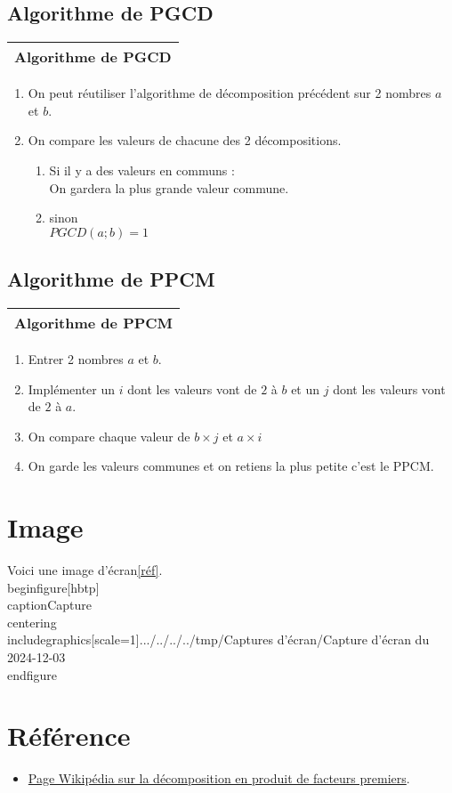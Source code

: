 \documentclass[titlepage]{article}
\begin{document}
\subsection{Algorithme de PGCD}
\begin{tabular}{l}
\hline
Algorithme de PGCD\\
\hline 
\end{tabular}
\begin{enumerate}
\item On peut réutiliser l'algorithme de décomposition précédent sur 2 nombres $a$ et $b$.
\item On compare les valeurs de chacune des 2 décompositions.
\begin{enumerate}
\item Si il y a des valeurs en communs :\\
On gardera la plus grande valeur commune.\\
\item sinon\\
$PGCD( a ; b ) = 1 $
\end{enumerate}
\end{enumerate}

\subsection{Algorithme de PPCM}
\begin{tabular}{l}
\hline
Algorithme de PPCM\\
\hline 
\end{tabular}
\begin{enumerate}
\item Entrer 2 nombres $a$ et $b$.
\item Implémenter un $i$ dont les valeurs vont de $2$ à $b$ et un $j$ dont les valeurs vont de $2$ à $a$.
\item On compare chaque valeur de $b \times j$ et $a \times i$
\item On garde les valeurs communes et on retiens la plus petite c'est le PPCM.
\end{enumerate}

\section{Image}
Voici une image {d'écran}\ref{réf}.\\
begin{figure}[hbtp]\\
caption{Capture}\label{réf}\\
centering\\
includegraphics[scale=1]{.../../../../tmp/Captures d’écran/Capture d’écran du 2024-12-03}\\
end{figure}\\

\section{Référence}
\begin{itemize}
    \item \href{https://fr.wikipedia.org/wiki/Décomposition_en_produit_de_facteurs_premiers}{Page Wikipédia sur la décomposition en produit de facteurs premiers}.
\end{itemize}
\end{document}

